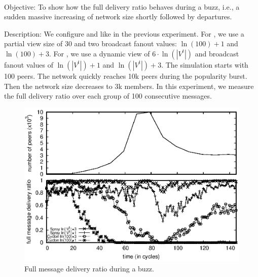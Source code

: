 \ \\

\begin{asparadesc}
\item [Objective:] To show how the full delivery ratio behaves during a buzz,
  i.e., a sudden massive increasing of network size shortly followed by
  departures.
\item [Description:] We configure \SPRAY and \CYCLON like in the
  previous experiment. For \CYCLON, we use a partial view size of 30
  and two broadcast fanout values: $\ln(100)+1$ and $\ln(100)+3$. For
  \SPRAY, we use a dynamic view of $6 \cdot \ln(|V^t|)$ and broadcast
  fanout values of $\ln(|V^t|)+1$ and $\ln(|V^t|)+3$. The simulation
  starts with 100 peers. The network quickly reaches 10k peers during
  the popularity burst. Then the network size decreases to 3k
  members. In this experiment, we measure the full delivery ratio over
  each group of 100 consecutive messages.

\begin{figure}
  \begin{center}
    \includegraphics[width=\SCALE\columnwidth]{img/peak.eps}
    \caption{\label{fig:peak}Full message delivery ratio during a buzz.}
  \end{center}
\end{figure}


\end{asparadesc}
